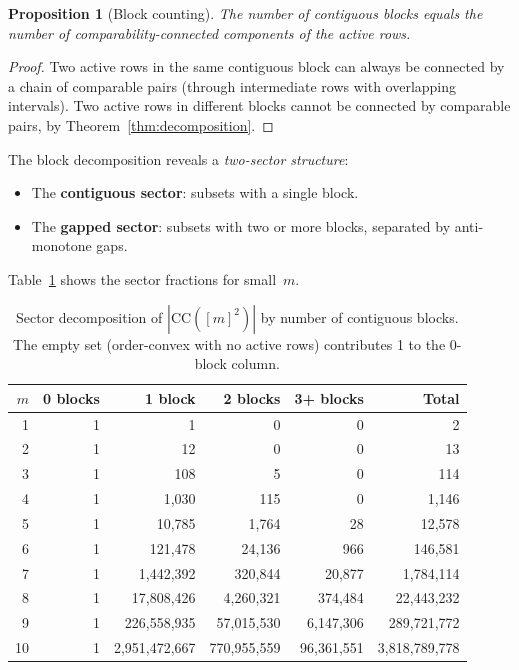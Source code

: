 \documentclass[11pt,a4paper]{article}
\theoremstyle{plain}
\newtheorem{proposition}[theorem]{Proposition}
\theoremstyle{definition}
\theoremstyle{remark}
\newcommand{\CC}{\mathrm{CC}}
\begin{document}
\begin{proposition}[Block counting]\label{prop:blocks}
The number of contiguous blocks equals the number of comparability-connected components of the active rows.
\end{proposition}

\begin{proof}
Two active rows in the same contiguous block can always be connected by a chain of comparable pairs (through intermediate rows with overlapping intervals).
Two active rows in different blocks cannot be connected by comparable pairs, by Theorem~\ref{thm:decomposition}.
\end{proof}

The block decomposition reveals a \emph{two-sector structure}:
\begin{itemize}[nosep]
\item The \textbf{contiguous sector}: subsets with a single block.
\item The \textbf{gapped sector}: subsets with two or more blocks, separated by anti-monotone gaps.
\end{itemize}

Table~\ref{tab:sectors} shows the sector fractions for small~$m$.

\begin{table}[h]
\centering
\begin{tabular}{r r r r r r}
\toprule
$m$ & 0 blocks & 1 block & 2 blocks & 3+ blocks & Total \\
\midrule
1 & 1 & 1 & 0 & 0 & 2 \\
2 & 1 & 12 & 0 & 0 & 13 \\
3 & 1 & 108 & 5 & 0 & 114 \\
4 & 1 & 1{,}030 & 115 & 0 & 1{,}146 \\
5 & 1 & 10{,}785 & 1{,}764 & 28 & 12{,}578 \\
6 & 1 & 121{,}478 & 24{,}136 & 966 & 146{,}581 \\
7 & 1 & 1{,}442{,}392 & 320{,}844 & 20{,}877 & 1{,}784{,}114 \\
8 & 1 & 17{,}808{,}426 & 4{,}260{,}321 & 374{,}484 & 22{,}443{,}232 \\
9 & 1 & 226{,}558{,}935 & 57{,}015{,}530 & 6{,}147{,}306 & 289{,}721{,}772 \\
10 & 1 & 2{,}951{,}472{,}667 & 770{,}955{,}559 & 96{,}361{,}551 & 3{,}818{,}789{,}778 \\
\bottomrule
\end{tabular}
\caption{Sector decomposition of $|\CC([m]^2)|$ by number of contiguous blocks. The empty set (order-convex with no active rows) contributes 1 to the 0-block column.}
\label{tab:sectors}
\end{table}
\end{document}

